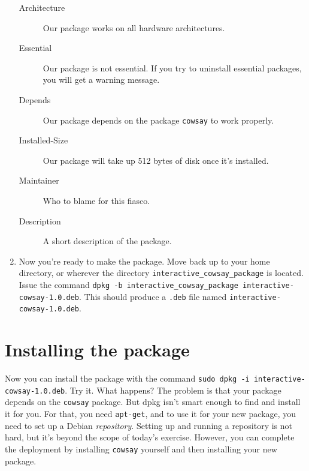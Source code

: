 \documentclass{article}
\begin{document}
\begin{enumerate}
\begin{description}
			\item[Architecture]Our package works on all hardware architectures.

			\item[Essential]Our package is not essential. If you try to uninstall essential packages, you will get a warning message.

			\item[Depends]Our package depends on the package \texttt{cowsay} to work properly.
				
			\item[Installed-Size]Our package will take up 512 bytes of disk once it's installed.

			\item[Maintainer]Who to blame for this fiasco.

			\item[Description]A short description of the package.
		\end{description}
	\item Now you're ready to make the package. Move back up to your home directory, or wherever the directory \texttt{interactive\_cowsay\_package} is located. Issue the command \texttt{dpkg -b interactive\_cowsay\_package interactive-cowsay-1.0.deb}. This should produce a \texttt{.deb} file named \texttt{interactive-cowsay-1.0.deb}.
	\end{enumerate}
	\section{Installing the package}
	Now you can install the package with the command \texttt{sudo dpkg -i interactive-cowsay-1.0.deb}. Try it.
		What happens?
		The problem is that your package depends on the \texttt{cowsay} package. But dpkg isn't smart enough to find and install it for you. For that, you need \texttt{apt-get}, and to use it for your new package, you need to set up a Debian \emph{repository}. Setting up and running a repository is not hard, but it's beyond the scope of today's exercise.  However, you can complete the deployment by installing \texttt{cowsay} yourself and then installing your new package.
\end{document}
